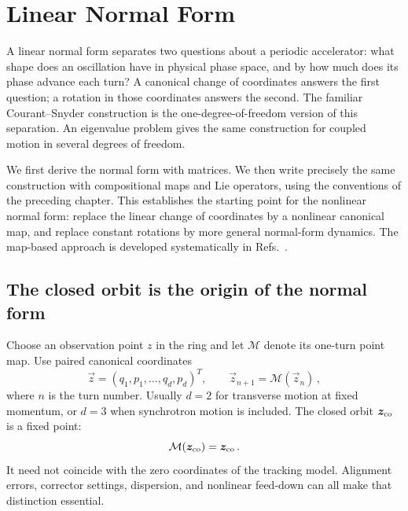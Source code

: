 \chapter{Linear Normal Form}
\label{chap:linear-normal-form}

A linear normal form separates two questions about a periodic accelerator:
what shape does an oscillation have in physical phase space, and by how much
does its phase advance each turn? A canonical change of coordinates answers
the first question; a rotation in those coordinates answers the second.
The familiar Courant--Snyder construction is the one-degree-of-freedom
version of this separation. An eigenvalue problem gives the same construction
for coupled motion in several degrees of freedom.

We first derive the normal form with matrices. We then write precisely the
same construction with compositional maps and Lie operators, using the
conventions of the preceding chapter. This establishes the starting point
for the nonlinear normal form: replace the linear change of coordinates by
a nonlinear canonical map, and replace constant rotations by more general
normal-form dynamics. The map-based approach is developed systematically
in Refs.~\cite{Forest_book1,Forest_book2}.



\section{The closed orbit is the origin of the normal form}
\label{sec:lnf-closed-orbit}

Choose an observation point $z$ in the ring and let $\mathcal M$ denote its
one-turn point map. Use paired canonical coordinates
\begin{equation}
    \vec z = (q_1,p_1,\ldots,q_d,p_d)^T,
    \qquad \vec z_{n + 1} = \mathcal M(\vec z_n)\,,
\end{equation}
where $n$ is the turn number. Usually $d = 2$ for transverse motion at fixed
momentum, or $d = 3$ when synchrotron motion is included. The closed orbit
$\vec z_{\rm co}$ is a fixed point:
\begin{equation}\label{eq:lnf-fixed-point}
    \mathcal M(\vec z_{\rm co}) = \vec z_{\rm co}\,.
\end{equation}
It need not coincide with the zero coordinates of the tracking model.
Alignment errors, corrector settings, dispersion, and nonlinear feed-down
can all make that distinction essential.

